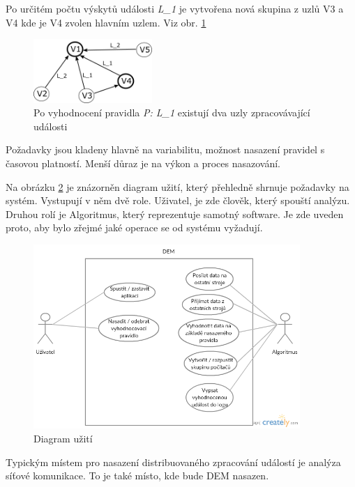 \documentclass[
  digital, %
  table,   %
  nolof,     %
  nolot,     %
  oneside, %
  nocover,
  monochrome,
  12pt
]{fithesis3}
\begin{document}
Po určitém počtu výskytů události \textit{L\_1} je vytvořena nová skupina z uzlů V3 a V4 kde je V4 zvolen hlavním uzlem. Viz obr. \ref{fig:analysis_case_2}

\begin{figure}[H]
	\centering
    \includegraphics[width=0.4\textwidth, height=0.15\textheight]{images/analysis_case_2.png}
    \caption{Po vyhodnocení pravidla \textit{P: L\_1} existují dva uzly zpracovávající události}
    \label{fig:analysis_case_2}
\end{figure}

Požadavky jsou kladeny hlavně na variabilitu, možnost nasazení pravidel s časovou platností. Menší důraz je na výkon a proces nasazování.

Na obrázku \ref{fig:usecase} je znázorněn diagram užití, který přehledně shrnuje požadavky na systém. Vystupují v něm dvě role. Uživatel, je zde člověk, který spouští analýzu. Druhou rolí je Algoritmus, který reprezentuje samotný software. Je zde uveden proto, aby bylo zřejmé jaké operace se od systému vyžadují.

\begin{figure}[H]
	\centering
    \includegraphics[width=0.9\textwidth, height=0.45\textheight]{images/usecase.png}
    \caption{Diagram užití}
    \label{fig:usecase}
\end{figure}

Typickým místem pro nasazení distribuovaného zpracování událostí je analýza síťové komunikace. To je také místo, kde bude DEM nasazen.
\end{document}
